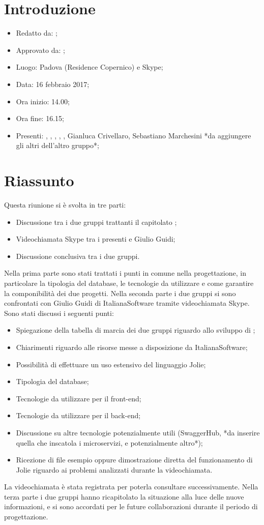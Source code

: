 \section{Introduzione}

	\begin{itemize}
		\item Redatto da: \MC;
		\item Approvato da: \AS;
		\item Luogo: Padova (Residence Copernico) e Skype;
		\item Data: 16 febbraio 2017;
		\item Ora inizio: 14.00;
		\item Ora fine: 16.15;
		\item Presenti: \AN, \DAN, \DS, \MC, \NS, Gianluca Crivellaro, Sebastiano Marchesini *da aggiungere gli altri dell'altro gruppo*;		
	\end{itemize}

\section{Riassunto}
Questa riunione si è svolta in tre parti:
\begin{itemize}
	\item Discussione tra i due gruppi trattanti il capitolato \progetto;
	\item Videochiamata Skype tra i presenti e Giulio Guidi;
	\item Discussione conclusiva tra i due gruppi.
\end{itemize}
Nella prima parte sono stati trattati i punti in comune nella progettazione, in particolare la tipologia del database, le tecnologie da utilizzare e come garantire la componibilità dei due progetti.
Nella seconda parte i due gruppi si sono confrontati con Giulio Guidi di ItalianaSoftware tramite videochiamata Skype. Sono stati discussi i seguenti punti:
\begin{itemize}
	\item Spiegazione della tabella di marcia dei due gruppi riguardo allo sviluppo di \progetto;
	\item Chiarimenti riguardo alle risorse messe a disposizione da ItalianaSoftware;
	\item Possibilità di effettuare un uso estensivo del linguaggio Jolie;
	\item Tipologia del database;
	\item Tecnologie da utilizzare per il front-end;
	\item Tecnologie da utilizzare per il back-end;
	\item Discussione su altre tecnologie potenzialmente utili (SwaggerHub, *da inserire quella che inscatola i microservizi, e potenzialmente altro*);
	\item Ricezione di file esempio oppure dimostrazione diretta del funzionamento di Jolie riguardo ai problemi analizzati durante la videochiamata.
\end{itemize}
La videochiamata è stata registrata per poterla consultare successivamente.
Nella terza parte i due gruppi hanno ricapitolato la situazione alla luce delle nuove informazioni, e si sono accordati per le future collaborazioni durante il periodo di progettazione.
